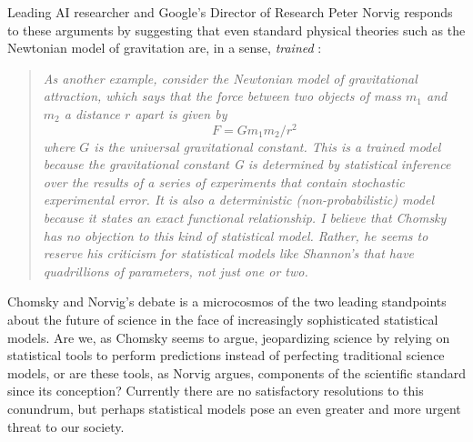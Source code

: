 \documentclass[fleqn,10pt]{article}
\begin{document}
Leading AI researcher and Google's Director of Research Peter Norvig responds to these arguments by suggesting that even standard physical theories such as the Newtonian model of gravitation are, in a sense, \emph{trained} \cite{norvig2017chomsky}:

\begin{quotation}
\textsl{As another example, consider the Newtonian model of gravitational attraction, which says that the force between two objects of mass $m_1$ and $m_2$ a distance $r$ apart is given by}
\begin{equation*}
F = G m_1 m_2 / r^2
\end{equation*}
\textsl{where $G$ is the universal gravitational constant. This is a trained model because the gravitational constant G is determined by statistical inference over the results of a series of experiments that contain stochastic experimental error. It is also a deterministic (non-probabilistic) model because it states an exact functional relationship. I believe that Chomsky has no objection to this kind of statistical model. Rather, he seems to reserve his criticism for statistical models like Shannon's that have quadrillions of parameters, not just one or two.}
\end{quotation}

Chomsky and Norvig's debate \cite{norvig2017chomsky} is a microcosmos of the two leading standpoints about the future of science in the face of increasingly sophisticated statistical models. Are we, as Chomsky seems to argue, jeopardizing science by relying on statistical tools to perform predictions instead of perfecting traditional science models, or are these tools, as Norvig argues, components of the scientific standard since its conception? Currently there are no satisfactory resolutions to this conundrum, but perhaps statistical models pose an even greater and more urgent threat to our society. 
\end{document}
